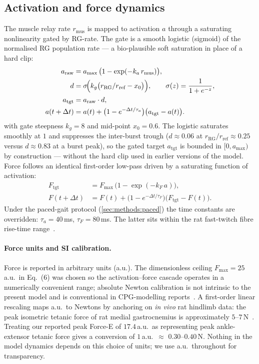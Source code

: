 \subsection{Activation and force dynamics}\label{sec:methods:muscle}
The muscle relay rate $r_{\text{mus}}$ is mapped to activation $a$
through a saturating nonlinearity gated by RG-rate. The gate is a smooth
logistic (sigmoid) of the normalised RG population rate --- a
bio-plausible soft saturation in place of a hard clip:
\begin{align}
  a_{\text{raw}} &= a_{\max} \, \bigl(1 - \exp(-k_a \, r_{\text{mus}})\bigr), \label{eq:araw}\\
  d &= \sigma\!\Bigl(k_g\bigl(r_{\text{RG}}/r_{\text{ref}} - x_0\bigr)\Bigr),
       \qquad \sigma(z)=\frac{1}{1+e^{-z}}, \label{eq:gate}\\
  a_{\text{tgt}} &= a_{\text{raw}} \cdot d, \label{eq:atgt}\\
  a(t+\Delta t) &= a(t) + \bigl(1 - e^{-\Delta t/\tau_a}\bigr)\bigl(a_{\text{tgt}} - a(t)\bigr).
  \label{eq:alp}
\end{align}
with gate steepness $k_g=8$ and mid-point $x_0=0.6$. The logistic
saturates smoothly at $1$ and suppresses the inter-burst trough
($d\approx0.06$ at $r_{\text{RG}}/r_{\text{ref}}\approx0.25$ versus
$d\approx0.83$ at a burst peak), so the gated target $a_{\text{tgt}}$ is
bounded in $[0,a_{\max})$ by construction --- without the hard clip used
in earlier versions of the model.
Force follows an identical first-order low-pass driven by a saturating
function of activation:
\begin{align}
  F_{\text{tgt}} &= F_{\max} \, \bigl(1 - \exp(-k_F \, a)\bigr),\\
  F(t+\Delta t) &= F(t) + \bigl(1 - e^{-\Delta t/\tau_F}\bigr)\bigl(F_{\text{tgt}} - F(t)\bigr).
\end{align}
Under the paced-gait protocol (\autoref{sec:methods:paced}) the time
constants are overridden: $\tau_a=40$\,ms, $\tau_F=80$\,ms. The latter
sits within the rat fast-twitch fibre rise-time
range~\cite{zajac1989,winters1995}.

\paragraph{Force units and SI calibration.}
Force is reported in arbitrary units (a.u.). The dimensionless ceiling
$F_{\max}=25$\,a.u.\ in Eq.~(6) was chosen so the activation--force
cascade operates in a numerically convenient range; absolute Newton
calibration is not intrinsic to the present model and is conventional
in CPG-modelling reports~\cite{rybak2006,danner2017,zhang2022}. A
first-order linear rescaling maps a.u.\ to Newtons by anchoring on
\emph{in vivo} rat hindlimb data: the peak isometric tetanic force of
rat medial gastrocnemius is approximately
$5$--$7$\,N~\cite{roy1991,burkholderLieber2001}. Treating our reported
peak Force-E of $17.4$\,a.u.\ as representing peak ankle-extensor
tetanic force gives a conversion of $1$\,a.u.\ $\approx$
$0.30$--$0.40$\,N. Nothing in the model dynamics depends on this
choice of units; we use a.u.\ throughout for transparency.

